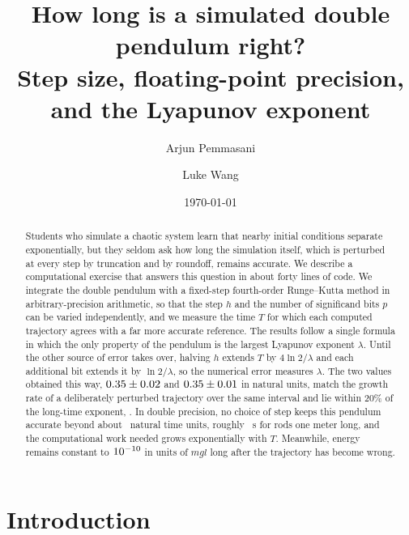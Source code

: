 \documentclass[prb,reprint,amsmath,amssymb,longbibliography]{revtex4-1}
\begin{document}
\title{How long is a simulated double pendulum right?\\
Step size, floating-point precision, and the Lyapunov exponent}

\ifanon
\else
\author{Arjun Pemmasani}
\author{Luke Wang}
\fi

\date{\today}

\begin{abstract}
Students who simulate a chaotic system learn that nearby initial conditions
separate exponentially, but they seldom ask how long the simulation itself,
which is perturbed at every step by truncation and by roundoff, remains
accurate. We describe a computational exercise that answers this question in
about forty lines of code. We integrate the double pendulum with a fixed-step
fourth-order Runge--Kutta method in arbitrary-precision arithmetic, so that the
step $h$ and the number of significand bits $p$ can be varied independently, and
we measure the time $T$ for which each computed trajectory agrees with a far
more accurate reference. The results follow a single formula in which the only
property of the pendulum is the largest Lyapunov exponent $\lambda$. Until the
other source of error takes over, halving $h$ extends $T$ by $4\ln 2/\lambda$
and each additional bit extends it by $\ln 2/\lambda$, so the numerical error
measures $\lambda$. The two values obtained this way,
$0.35\pm0.02$ and $0.35\pm0.01$ in natural units, match the
growth rate of a deliberately perturbed trajectory over the same interval and
lie within 20\% of the long-time exponent, \lamBen. In double precision, no
choice of step keeps this pendulum accurate beyond about \TBestDouble\ natural
time units, roughly \TBestDoubleSec~s for rods one meter long, and the
computational work needed grows exponentially with $T$. Meanwhile, energy
remains constant to $10^{-10}$ in units of $mgl$ long after the trajectory
has become wrong.
\end{abstract}

\maketitle

\section{Introduction}
\end{document}
